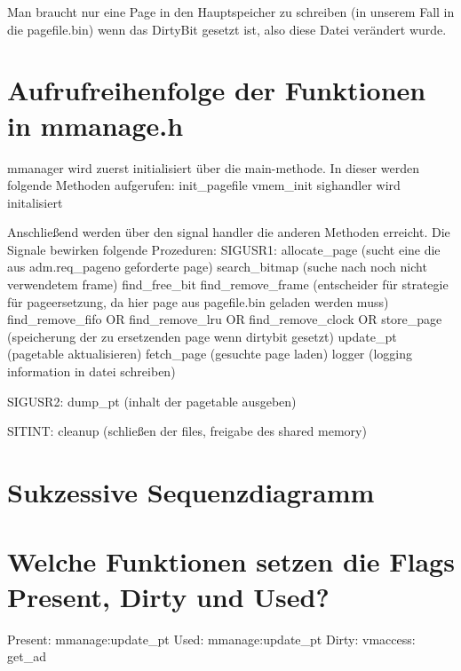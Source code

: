 \documentclass[pdftex,10pt,a4paper]{article}
\begin{document}
Man braucht nur eine Page in den Hauptspeicher zu schreiben (in unserem Fall in die pagefile.bin) wenn das DirtyBit gesetzt ist, also diese Datei verändert wurde.

\section{Aufrufreihenfolge der Funktionen in mmanage.h}
mmanager wird zuerst initialisiert über die main-methode. In dieser werden folgende Methoden aufgerufen:
init\_pagefile
vmem\_init
sighandler wird initalisiert

Anschließend werden über den signal handler die anderen Methoden erreicht. Die Signale bewirken folgende Prozeduren:
SIGUSR1:
allocate\_page (sucht eine die aus adm.req\_pageno geforderte page)
	search\_bitmap  (suche nach noch nicht verwendetem frame)
		find\_free\_bit
	find\_remove\_frame (entscheider für strategie für pageersetzung, da hier page aus pagefile.bin geladen werden muss)
		find\_remove\_fifo OR
		find\_remove\_lru OR
		find\_remove\_clock OR
	store\_page (speicherung der zu ersetzenden page wenn dirtybit gesetzt)
	update\_pt (pagetable aktualisieren)
	fetch\_page (gesuchte page laden)
	logger	(logging information in datei schreiben)
	
SIGUSR2:
dump\_pt (inhalt der pagetable ausgeben)

SITINT:
cleanup (schließen der files, freigabe des shared memory)

\section{Sukzessive Sequenzdiagramm}


\section{Welche Funktionen setzen die Flags Present, Dirty und Used?}
Present: mmanage:update\_pt
Used: mmanage:update\_pt
Dirty: vmaccess: get\_ad
\end{document}
